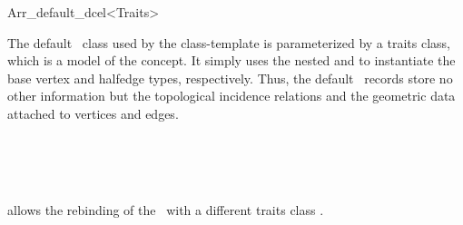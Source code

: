
\ccRefPageBegin

\begin{ccRefClass}{Arr_default_dcel<Traits>}

\ccDefinition

The default \dcel\ class used by the  class-template
is parameterized by a traits class, which is a model of the
 concept. It simply uses the nested
 and  to instantiate
the base vertex and halfedge types, respectively. Thus, the default \dcel\
records store no other information but the topological incidence relations
and the geometric data attached to vertices and edges.


\ccIsModel

\ccInheritsFrom
     \\
    ~~~~~~~~~~ \\
    ~~~~~~~~~~ \ccc{Arr_face_base>}

\ccTypes

   {allows the rebinding of the \dcel\ with a different traits class .}

\ccSeeAlso


\end{ccRefClass}

\ccRefPageEnd
